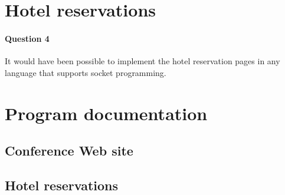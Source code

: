 \documentclass[a4paper,10pt]{article}
\begin{document}
\section{Hotel reservations}
\paragraph{Question 4}
It would have been possible to implement the hotel reservation pages in any language
that supports socket programming.

\section{Program documentation}
\subsection{Conference Web site}

\subsection{Hotel reservations}
\end{document}
